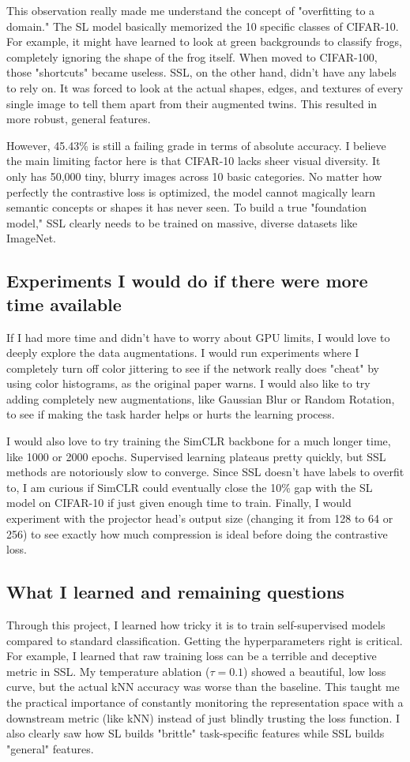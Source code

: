 \documentclass[12pt]{article}
\begin{document}
This observation really made me understand the concept of "overfitting to a domain." The SL model basically memorized the 10 specific classes of CIFAR-10. For example, it might have learned to look at green backgrounds to classify frogs, completely ignoring the shape of the frog itself. When moved to CIFAR-100, those "shortcuts" became useless. SSL, on the other hand, didn't have any labels to rely on. It was forced to look at the actual shapes, edges, and textures of every single image to tell them apart from their augmented twins. This resulted in more robust, general features. 

However, 45.43\% is still a failing grade in terms of absolute accuracy. I believe the main limiting factor here is that CIFAR-10 lacks sheer visual diversity. It only has 50,000 tiny, blurry images across 10 basic categories. No matter how perfectly the contrastive loss is optimized, the model cannot magically learn semantic concepts or shapes it has never seen. To build a true "foundation model," SSL clearly needs to be trained on massive, diverse datasets like ImageNet.

\subsection{Experiments I would do if there were more time available}
If I had more time and didn't have to worry about GPU limits, I would love to deeply explore the data augmentations. I would run experiments where I completely turn off color jittering to see if the network really does "cheat" by using color histograms, as the original paper warns. I would also like to try adding completely new augmentations, like Gaussian Blur or Random Rotation, to see if making the task harder helps or hurts the learning process.

I would also love to try training the SimCLR backbone for a much longer time, like 1000 or 2000 epochs. Supervised learning plateaus pretty quickly, but SSL methods are notoriously slow to converge. Since SSL doesn't have labels to overfit to, I am curious if SimCLR could eventually close the 10\% gap with the SL model on CIFAR-10 if just given enough time to train. Finally, I would experiment with the projector head's output size (changing it from 128 to 64 or 256) to see exactly how much compression is ideal before doing the contrastive loss.

\subsection{What I learned and remaining questions}
Through this project, I learned how tricky it is to train self-supervised models compared to standard classification. Getting the hyperparameters right is critical. For example, I learned that raw training loss can be a terrible and deceptive metric in SSL. My temperature ablation ($\tau=0.1$) showed a beautiful, low loss curve, but the actual kNN accuracy was worse than the baseline. This taught me the practical importance of constantly monitoring the representation space with a downstream metric (like kNN) instead of just blindly trusting the loss function. I also clearly saw how SL builds "brittle" task-specific features while SSL builds "general" features.
\end{document}
